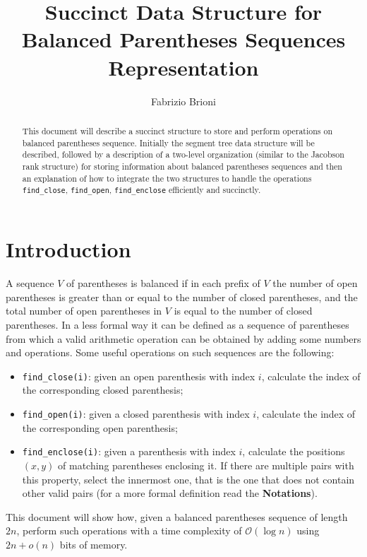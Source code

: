 \documentclass{article}
\title{Succinct Data Structure for Balanced Parentheses Sequences Representation}
\author{Fabrizio Brioni}
\begin{document}
\maketitle

\begin{abstract}
This document will describe a succinct structure to store and perform operations on balanced parentheses sequence. Initially the segment tree data structure will be described, followed by a description of a two-level organization (similar to the Jacobson rank structure) for storing information about balanced parentheses sequences and then an explanation of how to integrate the two structures to handle the operations \texttt{find\_close}, \texttt{find\_open}, \texttt{find\_enclose} efficiently and succinctly.
\end{abstract}

\section{Introduction}
A sequence $V$ of parentheses is balanced if in each prefix of $V$ the number of open parentheses is greater than or equal to the number of closed parentheses, and the total number of open parentheses in $V$ is equal to the number of closed parentheses. In a less formal way it can be defined as a sequence of parentheses from which a valid arithmetic operation can be obtained by adding some numbers and operations. Some useful operations on such sequences are the following:
    \begin{itemize}
    \item \texttt{find\_close(i)}: given an open parenthesis with index $i$, calculate the index of the corresponding closed parenthesis;
    \item \texttt{find\_open(i)}: given a closed parenthesis with index $i$, calculate the index of the corresponding open parenthesis;
    \item \texttt{find\_enclose(i)}: given a parenthesis with index $i$, calculate the positions $(x,y)$ of matching parentheses enclosing it. If there are multiple pairs with this property, select the innermost one, that is the one that does not contain other valid pairs (for a more formal definition read the \textbf{Notations}). 
    \end{itemize}
This document will show how, given a balanced parentheses sequence of length $2n$, perform such operations with a time complexity of $\mathcal{O}(\log{n})$ using $2n + o(n)$ bits of memory.
\end{document}
